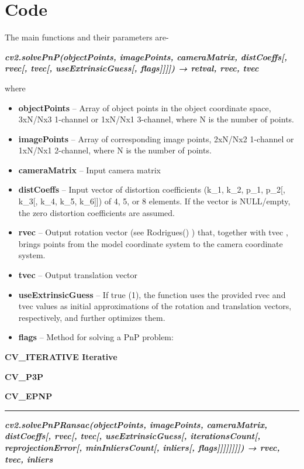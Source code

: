 \documentclass[]{article}
\begin{document}
\section{Code}\label{code}

The main functions and their parameters are-

\emph{\textbf{cv2.solvePnP(objectPoints, imagePoints, cameraMatrix,
distCoeffs{[}, rvec{[}, tvec{[}, useExtrinsicGuess{[},
flags{]}{]}{]}{]}) → retval, rvec, tvec}}

where

\begin{itemize}
\item
  \textbf{objectPoints} -- Array of object points in the object
  coordinate space, 3xN/Nx3 1-channel or 1xN/Nx1 3-channel, where N is
  the number of points.
\item
  \textbf{imagePoints} -- Array of corresponding image points, 2xN/Nx2
  1-channel or 1xN/Nx1 2-channel, where N is the number of points.
\item
  \textbf{cameraMatrix} -- Input camera matrix
\item
  \textbf{distCoeffs} -- Input vector of distortion coefficients (k\_1,
  k\_2, p\_1, p\_2{[}, k\_3{[}, k\_4, k\_5, k\_6{]}{]}) of 4, 5, or 8
  elements. If the vector is NULL/empty, the zero distortion
  coefficients are assumed.
\item
  \textbf{rvec} -- Output rotation vector (see Rodrigues() ) that,
  together with tvec , brings points from the model coordinate system to
  the camera coordinate system.
\item
  \textbf{tvec} -- Output translation vector
\item
  \textbf{useExtrinsicGuess} -- If true (1), the function uses the
  provided rvec and tvec values as initial approximations of the
  rotation and translation vectors, respectively, and further optimizes
  them.
\item
  \textbf{flags} -- Method for solving a PnP problem:
\end{itemize}

\textbf{CV\_ITERATIVE Iterative}

\textbf{CV\_P3P}

\textbf{CV\_EPNP}

\begin{center}\rule{0.5\linewidth}{\linethickness}\end{center}

\emph{\textbf{cv2.solvePnPRansac(objectPoints, imagePoints,
cameraMatrix, distCoeffs{[}, rvec{[}, tvec{[}, useExtrinsicGuess{[},
iterationsCount{[}, reprojectionError{[}, minInliersCount{[},
inliers{[}, flags{]}{]}{]}{]}{]}{]}{]}{]}) → rvec, tvec, inliers}}
\end{document}
